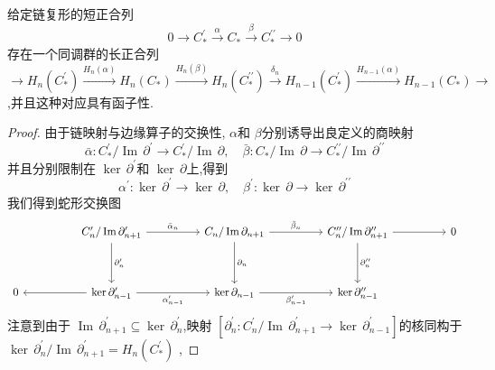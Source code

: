 \documentclass[../../几何与拓扑.tex]{subfiles}
\begin{document}
\begin{theorem}\label{thm:short-exact-to-homo-long-exact}
    给定链复形的短正合列 \[
        0\longrightarrow C_{*}^{\prime}\xrightarrow{\alpha}C_{*}\xrightarrow{\beta}C_{*}^{\prime\prime}\longrightarrow0
    \]存在一个同调群的长正合列 \[
        \longrightarrow H_n(C_*^{\prime})\overset{H_n(\alpha)}{\operatorname*{\operatorname*{\longrightarrow}}}H_n(C_*)\overset{H_n(\beta)}{\operatorname*{\operatorname*{\longrightarrow}}}H_n(C_*^{\prime\prime})\overset{\delta_n}{\operatorname*{\operatorname*{\longrightarrow}}}H_{n-1}(C_*^{\prime})\overset{H_{n-1}(\alpha)}{\operatorname*{\operatorname*{\longrightarrow}}}H_{n-1}(C_*)\longrightarrow
    \],并且这种对应具有函子性.
\end{theorem}

\begin{proof}
    由于链映射与边缘算子的交换性, \(  \alpha   \)和 \(  \beta   \)分别诱导出良定义的商映射 \[
     \bar{\alpha}: C_{*}^{\prime} / \operatorname{Im}\,\partial ^{\prime}\to   C_{*}^{\prime} / \operatorname{Im}\,\partial ,\quad  \bar{\beta}: C_{*} /\operatorname{Im}\,\partial \to C_{*} ^{\prime \prime} / \operatorname{Im}\,\partial ^{\prime \prime}  
    \]  并且分别限制在 \(  \operatorname{ker}\,\partial ^{\prime}   \)和 \(  \operatorname{ker}\,\partial   \)上,得到 \[
     \alpha ^{\prime} : \operatorname{ker}\,\partial ^{\prime} \to  \operatorname{ker}\, \partial ,\quad  \beta ^{\prime} : \operatorname{ker}\,\partial \to \operatorname{ker}\, \partial ^{\prime \prime} 
    \]  我们得到蛇形交换图
    \[\begin{tikzcd}
	&& {C_n^{\prime} / \operatorname{Im} \partial_{n+1}^{\prime}} && {C_n / \operatorname{Im} \partial_{n+1}} && {C_n^{\prime\prime} / \operatorname{Im} \partial_{n+1}^{\prime\prime}} && 0 \\
	\\
	0 && {\ker \partial_{n-1}^{\prime}} && {\ker \partial_{n-1}} && {\ker \partial_{n-1}^{\prime\prime}}
	\arrow["{\bar{\alpha}_n}", from=1-3, to=1-5]
	\arrow["{\partial_n^{\prime}}", from=1-3, to=3-3]
	\arrow["{\bar{\beta}_n}", from=1-5, to=1-7]
	\arrow["{\partial_n}", from=1-5, to=3-5]
	\arrow[from=1-7, to=1-9]
	\arrow["{\partial_n^{\prime\prime}}", from=1-7, to=3-7]
	\arrow[from=3-3, to=3-1]
	\arrow["{\alpha_{n-1}^{\prime}}"', from=3-3, to=3-5]
	\arrow["{\beta_{n-1}^{\prime}}"', from=3-5, to=3-7]
\end{tikzcd}\]
    注意到由于 \(  \operatorname{Im}\,  \partial ^{\prime} _{n+ 1}\subseteq  \operatorname{ker}\,\partial ^{\prime} _{n} \),映射 \(  [\partial _{n}^{\prime} : C_{n}^{\prime} /\operatorname{Im}\,\partial _{n+ 1}^{\prime} \to  \operatorname{ker}\,\partial _{n-1}^{\prime} ]  \)的核同构于 \(  \operatorname{ker}\, \partial _{n}^{\prime}  /\operatorname{Im}\,\partial _{n+ 1}^{\prime}  =  H_{n}\left( C_{*}^{\prime}  \right)   \) ,

\end{proof}
\end{document}
